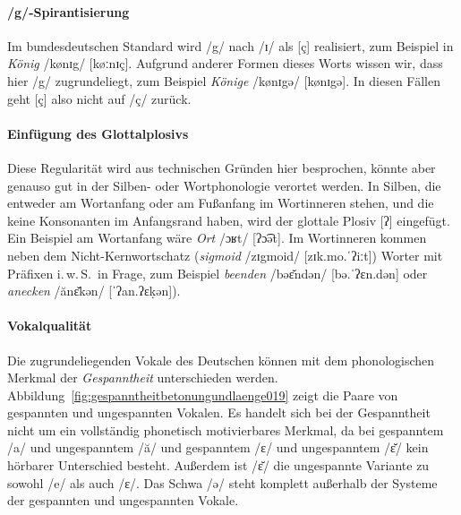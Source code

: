 \paragraph*{/g/-Spirantisierung}

Im bundesdeutschen Standard wird /g/ nach /ɪ/ als [ç] realisiert, zum Beispiel in \textit{König} /kønɪg/ [køːnɪç].
Aufgrund anderer Formen dieses Worts wissen wir, dass hier /g/ zugrundeliegt, zum Beispiel \textit{Könige} /kønɪgə/ [kønɪgə].
In diesen Fällen geht [ç] also nicht auf /ç/ zurück.

\paragraph*{Einfügung des Glottalplosivs}

Diese Regularität wird aus technischen Gründen hier besprochen, könnte aber genauso gut in der Silben- oder Wortphonologie verortet werden.
In Silben, die entweder am Wortanfang oder am Fußanfang im Wortinneren stehen, und die keine Konsonanten im Anfangsrand haben, wird der glottale Plosiv [ʔ] eingefügt.
Ein Beispiel am Wortanfang wäre \textit{Ort} /ɔʁt/ [ʔɔ͡ət].
Im Wortinneren kommen neben dem Nicht-Kernwortschatz (\textit{sigmoid} /zɪgmoid/ [zɪk.mo.ˈʔiːt]) Worter mit Präfixen i.\,w.\,S.\ in Frage, zum Beispiel \textit{beenden} /bəɛ̆ndən/ [bə.ˈʔɛn.dən] oder \textit{anecken} /ănɛ̆kən/ [ˈʔan.ʔɛḳən]).

\paragraph*{Vokalqualität}

Die zugrundeliegenden Vokale des Deutschen können mit dem phonologischen Merkmal der \textit{Gespanntheit} unterschieden werden.
Abbildung~\ref{fig:gespanntheitbetonungundlaenge019} zeigt die Paare von gespannten und ungespannten Vokalen.
Es handelt sich bei der Gespanntheit nicht um ein vollständig phonetisch motivierbares Merkmal, da bei gespanntem /a/ und ungespanntem /ă/ und gespanntem /ɛ/ und ungespanntem /ɛ̆/ kein hörbarer Unterschied besteht.
Außerdem ist /ɛ̆/ die ungespannte Variante zu sowohl /e/ als auch /ɛ/.
Das Schwa /ə/ steht komplett außerhalb der Systeme der gespannten und ungespannten Vokale.

